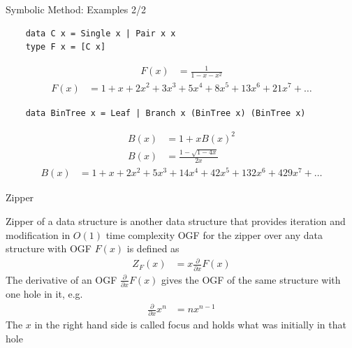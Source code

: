 \documentclass[pdf]{beamer}
\begin{document}
\begin{frame}[fragile]{Symbolic Method: Examples 2/2}
  \begin{verbatim}
    data C x = Single x | Pair x x
    type F x = [C x]
  \end{verbatim}
  \begin{align*}
    F(x) &= \frac{1}{1 - x - x^2}
  \end{align*}
  \begin{align*}
    F(x) &= 1 + x + 2 x^2 + 3 x^3 + 5 x^4 + 8 x^5 + 13 x^6 + 21 x^7 + \ldots
  \end{align*}
  \begin{verbatim}
    data BinTree x = Leaf | Branch x (BinTree x) (BinTree x)
  \end{verbatim}
  \begin{align*}
    B(x) &= 1 + x B(x)^2 \\
    B(x) &= \frac{1 - \sqrt{1 - 4x}}{2x}
  \end{align*}
  \begin{align*}
    B(x) &= 1 + x + 2x^2 + 5x^3 + 14x^4 + 42x^5 + 132x^6 + 429x^7 + \ldots
  \end{align*}
\end{frame}

\begin{frame}{Zipper}
  \begin{outline}
    \1 Zipper of a data structure is another data structure that provides iteration and modification in $O(1)$ time complexity
    \1 OGF for the zipper over any data structure with OGF $F(x)$ is defined as
    \begin{align*}
      Z_F(x) &= x \frac{\partial}{\partial{x}}F(x)
    \end{align*}
    \1 The derivative of an OGF $\frac{\partial}{\partial{x}}F(x)$ gives the OGF of the same structure with one hole in it, e.g.
    \begin{align*}
      \frac{\partial}{\partial{x}}x^n &= n x^{n-1}
    \end{align*}
    \1 The $x$ in the right hand side is called focus and holds what was initially in that hole
  \end{outline}
\end{frame}
\end{document}
